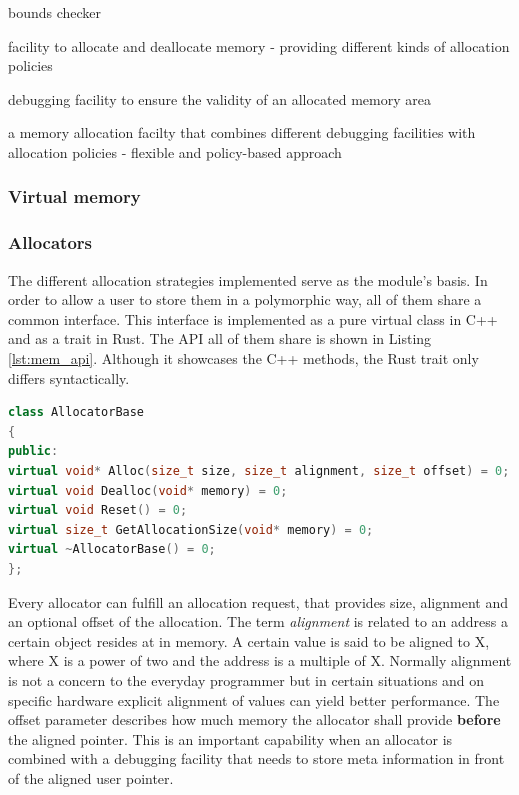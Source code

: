 \begin{labeling}{bounds checker}
	\item [allocator] facility to allocate and deallocate memory - providing different kinds of allocation policies
	\item [bounds checker] debugging facility to ensure the validity of an allocated memory area
	\item [memory realm] a memory allocation facilty that combines different 
	debugging facilities with allocation policies - flexible and policy-based approach
\end{labeling}

\subsubsection{Virtual memory}
\blindtext

\subsubsection{Allocators}

The different allocation strategies implemented serve as the module's basis. In order to allow a user to store them in a polymorphic way, all of them share a common interface. This interface is implemented as a pure virtual class in C++ and as a trait in Rust. The \ac{API} all of them share is shown in Listing \ref{lst:mem_api}. Although it showcases the C++ methods, the Rust trait only differs syntactically.\\

\begin{lstlisting}[caption={Common interface among all allocator implementation. Rust trait only differs syntactically from this C++ sample.}, label={lst:mem_api}, language={C++}]
class AllocatorBase
{
public:
virtual void* Alloc(size_t size, size_t alignment, size_t offset) = 0;
virtual void Dealloc(void* memory) = 0;
virtual void Reset() = 0;
virtual size_t GetAllocationSize(void* memory) = 0;
virtual ~AllocatorBase() = 0;
};
\end{lstlisting}

\noindent
Every allocator can fulfill an allocation request, that provides size, alignment and an optional offset of the allocation.  The term \textit{alignment} is related to an address a certain object resides at in memory. A certain value is said to be aligned to X, where X is a power of two and the address is a multiple of X. Normally alignment is not a concern to the everyday programmer but in certain situations and on specific hardware explicit alignment of values can yield better performance. The offset parameter describes how much memory the allocator shall provide \textbf{before} the aligned pointer. This is an important capability when an allocator is combined with a debugging facility that needs to store meta information in front of the aligned user pointer. 

